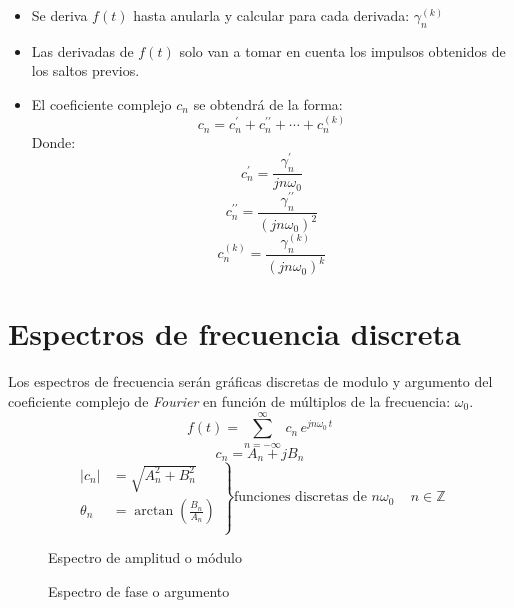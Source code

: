 \begin{itemize}
    \item Se deriva $f(t)$ hasta anularla y calcular para cada derivada:
    $\gamma^{(k)}_n$
    \item Las derivadas de $f(t)$ solo van a tomar en cuenta los impulsos
    obtenidos de los saltos previos.
    \item El coeficiente complejo $c_n$ se obtendrá de la forma:
    \begin{equation}
        c_n=c^\prime_n+c^{\prime\prime}_n+\cdots+c^{(k)}_n
    \end{equation}
    Donde:
    \begin{equation}
        c^\prime_n=\frac{\gamma^\prime_n}{jn\omega_0}
    \end{equation}
    \begin{equation}
        c^{\prime\prime}_n=\frac{\gamma^{\prime\prime}_n}{{(jn\omega_0)}^2}
    \end{equation}
    \begin{equation}
        c^{(k)}_n=\frac{\gamma^{(k)}_n}{{(jn\omega_0)}^k}
    \end{equation}
\end{itemize}

\section{Espectros de frecuencia discreta}
Los espectros de frecuencia serán gráficas discretas de modulo y argumento del
coeficiente complejo de \emph{Fourier} en función de múltiplos de la frecuencia:
$\omega_0$.
\begin{equation*}
    f(t)=\sum_{n=-\infty}^\infty\,c_n\,e^{jn\omega_0\,t}
\end{equation*}
\begin{equation*}
    c_n=A_n+jB_n
\end{equation*}
\begin{equation*}
\left.\begin{aligned}
    |c_n|&=\sqrt{A_n^2+B_n^2}\\
    \theta_n&=\arctan\left(\frac{B_n}{A_n}\right)\\
\end{aligned}\right\}
\text{funciones discretas de }n\omega_0\quad\,n\in\mathbb{Z}
\end{equation*}
\begin{figure}[H]
    \centering
    \begin{minipage}{.4\textwidth}
        \centering
        
        \captionsetup{labelformat=empty}
        \caption{Espectro de amplitud o módulo}
    \end{minipage}
    \begin{minipage}{.4\textwidth}
        \centering
        
        \captionsetup{labelformat=empty}
        \caption{Espectro de fase o argumento}
    \end{minipage}
\end{figure}

